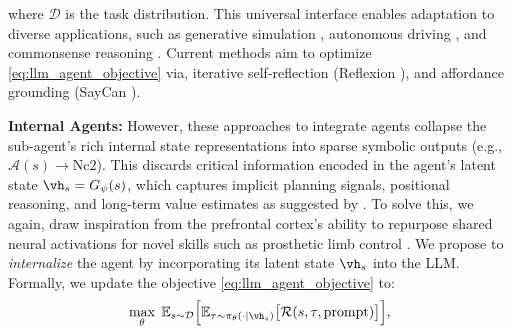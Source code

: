 \documentclass{article}
\theoremstyle{plain}
\theoremstyle{definition}
\theoremstyle{remark}
\begin{document}
where \(\mathcal{D}\) is the task distribution. This universal interface enables adaptation to diverse applications, such as generative simulation \cite{sun2024factorsim}, autonomous driving \cite{hu2024agentscodriver}, and commonsense reasoning \cite{zhao2024large}. Current methods aim to optimize \eqref{eq:llm_agent_objective} via, iterative self-reflection (Reflexion \cite{shinn2023reflexionlanguageagentsverbal}), and affordance grounding (SayCan \cite{ahn2022can}).

\textbf{Internal Agents:} However, these approaches to integrate agents collapse the sub-agent's rich internal state representations into sparse symbolic outputs (e.g., $\mathcal{A}(s) \to \text{Nc2}$). This discards critical information encoded in the agent's latent state $\vh_s = G_\psi(s)$, which captures implicit planning signals, positional reasoning, and long-term value estimates as suggested by \citet{jenner2024evidence}. To solve this, we again, draw inspiration from the prefrontal cortex's ability to repurpose shared neural activations for novel skills such as prosthetic limb control \cite{kieliba2021robotic}. We propose to \emph{internalize} the agent by incorporating its latent state $\vh_s$ into the LLM. Formally, we update the objective \ref{eq:llm_agent_objective} to:  
\vspace{-2mm}
\begin{equation}
\max_\theta \; \mathbb{E}_{s \sim \mathcal{D}} \Bigl[
  \mathbb{E}_{\tau \sim \pi_\theta(\cdot \mid\vh_s)} \bigl[\mathcal{R}(s, \tau, \text{prompt})\bigr]
\Bigr],
\label{eq:llamia_agent_objective}
\end{equation}




\end{document}
